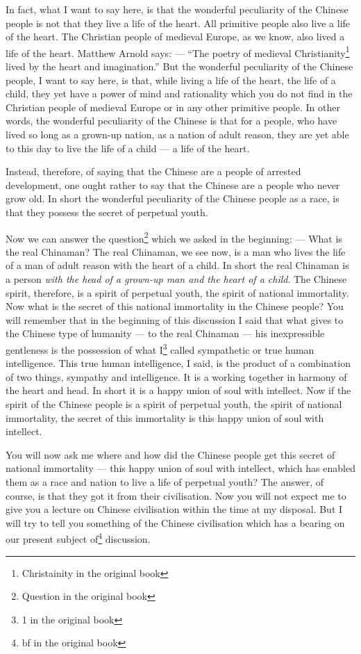 In fact, what I want to say here, is that the wonderful peculiarity of the Chinese people is not that they live a life of the heart.
All primitive people also live a life of the heart.
The Christian people of medieval Europe, as we know, also lived a life of the heart.
Matthew Arnold says: --- ``The poetry of medieval Christianity\footnote{Christainity in the original book} lived by the heart and imagination.''
But the wonderful peculiarity of the Chinese people, I want to say here, is that, while living a life of the heart, the life of a child, they yet have a power of mind and rationality which you do not find in the Christian people of medieval Europe or in any other primitive people.
In other words, the wonderful peculiarity of the Chinese is that for a people, who have lived so long as a grown-up nation, as a nation of adult reason, they are yet able to this day to live the life of a child --- a life of the heart.

Instead, therefore, of saying that the Chinese are a people of arrested development, one ought rather to say that the Chinese are a people who never grow old.
In short the wonderful peculiarity of the Chinese people as a race, is that they possess the secret of perpetual youth.

Now we can answer the question\footnote{Question in the original book} which we asked in the beginning: --- What is the real Chinaman?
The real Chinaman, we see now, is a man who lives the life of a man of adult reason with the heart of a child.
In short the real Chinaman is a person \emph{with the head of a grown-up man and the heart of a child}.
The Chinese spirit, therefore, is a spirit of perpetual youth, the spirit of national immortality.
Now what is the secret of this national immortality in the Chinese people?
You will remember that in the beginning of this discussion I said that what gives to the Chinese type of humanity --- to the real Chinaman --- his inexpressible gentleness is the possession of what I\footnote{1 in the original book} called sympathetic or true human intelligence.
This true human intelligence, I said, is the product of a combination of two things, sympathy and intelligence.
It is a working together in harmony of the heart and head.
In short it is a happy union of soul with intellect.
Now if the spirit of the Chinese people is a spirit of perpetual youth, the spirit of national immortality, the secret of this immortality is this happy union of soul with intellect.

You will now ask me where and how did the Chinese people get this secret of national immortality --- this happy union of soul with intellect, which has enabled them as a race and nation to live a life of perpetual youth?
The answer, of course, is that they got it from their civilisation.
Now you will not expect me to give you a lecture on Chinese civilisation within the time at my disposal.
But I will try to tell you something of the Chinese civilisation which has a bearing on our present subject of\footnote{bf in the original book} discussion.

